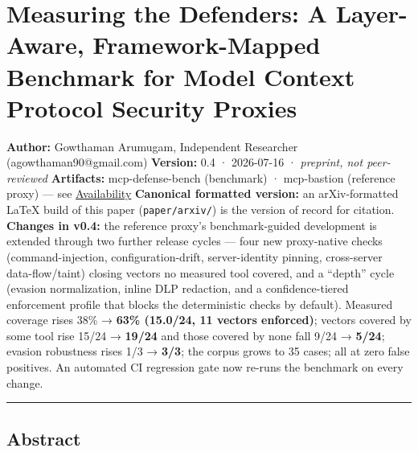 \documentclass[
]{article}
\author{}
\date{}
\newcounter{none} %
\begin{document}
\section{Measuring the Defenders: A Layer-Aware, Framework-Mapped
Benchmark for Model Context Protocol Security
Proxies}\label{measuring-the-defenders-a-layer-aware-framework-mapped-benchmark-for-model-context-protocol-security-proxies}

\textbf{Author:} Gowthaman Arumugam, Independent Researcher
(agowthaman90@gmail.com) \textbf{Version:} 0.4 · 2026-07-16 ·
\emph{preprint, not peer-reviewed} \textbf{Artifacts:} mcp-defense-bench
(benchmark) · mcp-bastion (reference proxy) --- see
\hyperref[availability]{Availability} \textbf{Canonical formatted
version:} an arXiv-formatted LaTeX build of this paper
(\texttt{paper/arxiv/}) is the version of record for citation.
\textbf{Changes in v0.4:} the reference proxy's benchmark-guided
development is extended through two further release cycles --- four new
proxy-native checks (command-injection, configuration-drift,
server-identity pinning, cross-server data-flow/taint) closing vectors
no measured tool covered, and a ``depth'' cycle (evasion normalization,
inline DLP redaction, and a confidence-tiered enforcement profile that
blocks the deterministic checks by default). Measured coverage rises
38\% → \textbf{63\% (15.0/24, 11 vectors enforced)}; vectors covered by
some tool rise 15/24 → \textbf{19/24} and those covered by none fall
9/24 → \textbf{5/24}; evasion robustness rises 1/3 → \textbf{3/3}; the
corpus grows to 35 cases; all at zero false positives. An automated CI
regression gate now re-runs the benchmark on every change.

\begin{center}\rule{0.5\linewidth}{0.5pt}\end{center}

\subsection{Abstract}\label{abstract}
\end{document}
